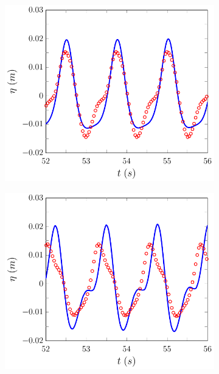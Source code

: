 %
\begin{figure}
	\centering
	\begin{subfigure}{0.5\textwidth}
		\includegraphics[width=\textwidth]{./chp6/figures/Experiment/Beji/sh/FEVMWG5.pdf}
		\vspace{0.5cm}
	\end{subfigure}%
	\begin{subfigure}{0.5\textwidth}
		\includegraphics[width=\textwidth]{./chp6/figures/Experiment/Beji/sh/FEVMWG6.pdf}

\end{subfigure}
\end{figure}
